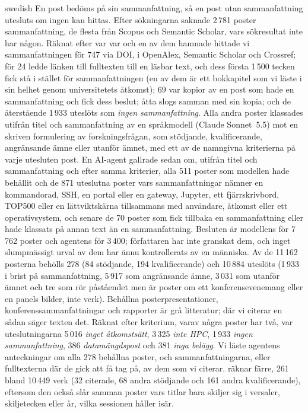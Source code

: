 \begin{onlyin}{swedish}
En post bedöms på sin sammanfattning, så en post utan sammanfattning
utesluts om ingen kan hittas.  Efter sökningarna saknade 2\,781 poster
sammanfattning, de flesta från Scopus och Semantic Scholar, vars
sökresultat inte har någon.  Räknat efter var var och en av dem hamnade
hittade vi sammanfattningen för 747 via DOI, i OpenAlex, Semantic
Scholar och Crossref; för 24 ledde länken till fulltexten till en läsbar
text, och dess första 1\,500 tecken fick stå i stället för
sammanfattningen (en av dem är ett bokkapitel som vi läste i sin helhet
genom universitetets åtkomst); 69 var kopior av en post som hade en
sammanfattning och fick dess beslut; åtta slogs samman med sin kopia;
och de återstående 1\,933 uteslöts som \emph{ingen sammanfattning}.  Alla andra
poster klassades utifrån titel och sammanfattning av
en språkmodell (Claude Sonnet~5.5) mot en skriven formulering av
forskningsfrågan, som stödjande, kvalificerande, angränsande ämne eller
utanför ämnet, med ett av de namngivna kriterierna på varje utesluten
post.  En AI-agent gallrade sedan om, utifrån titel och sammanfattning
och efter samma kriterier, alla 511 poster som modellen hade behållit
och de 871 uteslutna poster vars sammanfattningar nämner en kommandorad,
SSH, en portal eller en gateway, Jupyter, ett fjärrskrivbord, TOP500
eller en lättviktskärna tillsammans med användare, åtkomst eller ett
operativsystem, och senare de 70 poster som fick tillbaka en
sammanfattning eller hade klassats på annan text än en sammanfattning.
Besluten är modellens för 7\,762 poster och agentens för 3\,400;
författaren har inte granskat dem, och inget slumpmässigt urval av dem
har ännu kontrollerats av en människa.  Av de 11\,162 posterna behölls 278
(84 stödjande, 194 kvalificerande) och 10\,884 uteslöts (1\,933 i brist
på sammanfattning, 5\,917 som angränsande ämne, 3\,031 som utanför ämnet
och tre som rör påståendet men är poster om ett konferensevenemang eller
en panels bilder, inte verk).  Behållna posterpresentationer,
konferenssammanfattningar
och rapporter är grå litteratur; där vi citerar en sådan säger texten
det.  Räknat efter kriterium, varav några poster har två, var
uteslutningarna 5\,016 \emph{inget åtkomstsätt}, 3\,325 \emph{inte
HPC}, 1\,933 \emph{ingen sammanfattning}, 386 \emph{datamängdspost} och
381 \emph{inga belägg}.  Vi läste agentens anteckningar om alla 278
behållna poster, och sammanfattningarna, eller fulltexterna där de gick
att få tag på, av dem som vi citerar.   räknar
färre, 261 bland 10\,449 verk (32 citerade, 68 andra stödjande och 161
andra kvalificerande), eftersom den också slår samman poster vars titlar bara
skiljer sig i
versaler, skiljetecken eller år, vilka sessionen håller isär.
\end{onlyin}

